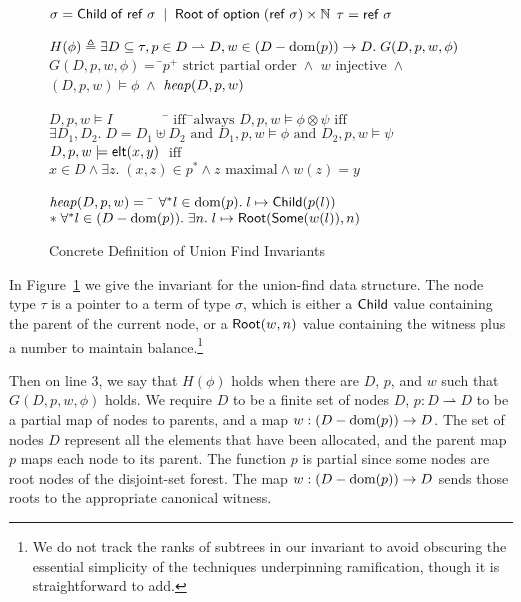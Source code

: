 \begin{figure}
\mbox{}
\begin{specification}
\nextline $\sigma = \mathsf{Child} \;\mathsf{of}\; \mathsf{ref}\;\sigma \;\;|\;\; \mathsf{Root} \;\mathsf{of}\; \mathsf{option }{\;}{(\mathsf{ref}\;\sigma)} \times \mathbb{N}$ 
\nextline $\tau = \mathsf{ref}\;\sigma$ 

\nextline
   $H(\phi) \triangleq \exists D \subseteq \tau, p \in D \rightharpoonup D, w \in (D-\mbox{dom}({p})) \to D.\;G(D,p,w,\phi)$
\nextline[1em] $G(D, p, w, \phi) =\;$\=$p^{+} \mbox{ strict partial order} \;\land$ 
\nextline \> $w \mbox{ injective} \;\land$ 
\nextline \> $(D, p, w) \models \phi \;\land$
\nextline \> $\mathit{heap}(D, p, w)$ 

\nextline[1em] $D, p, w \models I \qquad\qquad$\=$\mbox{ iff}\;\;$\=$\mbox{always}$ 
\nextline      $D, p, w \models \phi \otimes \psi$\>$\mbox{ iff}$\>$
                     \exists D_1, D_2.\; D = D_1 \uplus D_2 \mbox{ and } D_1, p, w \models \phi \mbox{ and } 
                     D_2, p, w \models \psi$
\nextline      $D, p, w \models \mathsf{elt}({x}, {y})$ \> $\mbox{ iff }$\>$x \in D \land \exists z.\;(x,z) \in p^* \land z\mbox{ maximal} \land w(z) = y$

\nextline[1em] $\mathit{heap}(D, p, w) = \;\;$\=
    $\forall^{*} l \in \mbox{dom}({p}).\; l \mapsto \mathsf{Child}(p(l))$ 
\nextline\>  $* \; \forall^{*} l \in (D - \mbox{dom}({p})).\; \exists n.\;l \mapsto \mathsf{Root}(\mathsf{Some}(w(l)), n)$ 
\end{specification}
\caption{Concrete Definition of Union Find Invariants}
\label{union-find:invariant}
\end{figure}
 
In Figure~\ref{union-find:invariant} we give the invariant for the
union-find data structure. The node type $\tau$ is a pointer to a 
term of type $\sigma$, which is either a $\mathsf{Child}$ value containing
the parent of the current node, or a $\mathsf{Root}(w, n)$ value containing
the witness plus a number to maintain balance.\footnote{We do not track the
ranks of subtrees in our invariant to avoid obscuring the essential
simplicity of the techniques underpinning ramification, though it is
straightforward to add.}

Then on line 3, we say that $H(\phi)$ holds when there are $D$, $p$, and
$w$ such that $G(D, p, w, \phi)$ holds. We require $D$ to be a finite set of
nodes $D$, $p : D \rightharpoonup D$ to be a partial map of nodes to parents, and a 
map $w : (D - \mbox{dom}({p})) \to D$. The set of nodes $D$ represent all the elements that have
been allocated, and the parent map $p$ maps each node to its
parent. The function $p$ is partial since some nodes are root nodes of
the disjoint-set forest. The map $w : (D - \mbox{dom}({p})) \to D$ sends
those roots to the appropriate canonical witness.

